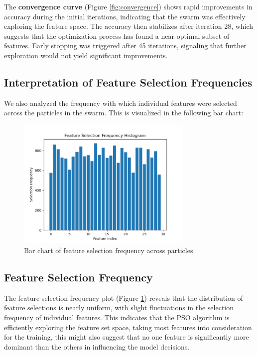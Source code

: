 \documentclass[12pt]{article}
\begin{document}
The \textbf{convergence curve} (Figure \ref{fig:convergence}) shows rapid improvements in accuracy during the initial iterations, indicating that the swarm was effectively exploring the feature space. The accuracy then stabilizes after iteration 28, which suggests that the optimization process has found a near-optimal subset of features. Early stopping was triggered after 45 iterations, signaling that further exploration would not yield significant improvements.

\subsection{Interpretation of Feature Selection Frequencies}

We also analyzed the frequency with which individual features were selected across the particles in the swarm. This is visualized in the following bar chart:

\begin{figure}[H]
    \centering
    \includegraphics[width=0.75\textwidth]{feature_selection_frequency.png}
    \caption{Bar chart of feature selection frequency across particles.}
    \label{fig:feature_freq}
\end{figure}

\subsection{Feature Selection Frequency}

The feature selection frequency plot (Figure \ref{fig:feature_freq}) reveals that the distribution of feature selections is nearly uniform, with slight fluctuations in the selection frequency of individual features. This indicates that the PSO algorithm is efficiently exploring the feature set space, taking most features into consideration for the training, this might also suggest that no one feature is significantly more dominant than the others in influencing the model decisions. 
\end{document}
